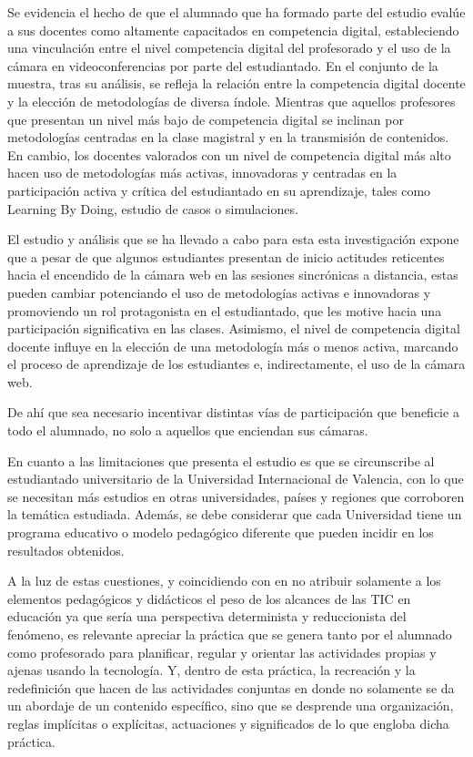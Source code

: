 \documentclass[spanish]{textolivre}
\begin{document}
Se evidencia el hecho de que el alumnado que ha formado parte del estudio evalúe a sus docentes como altamente capacitados en competencia digital, estableciendo una vinculación entre el nivel competencia digital del profesorado y el uso de la cámara en videoconferencias por parte del estudiantado. En el conjunto de la muestra, tras su análisis, se refleja la relación entre la competencia digital docente y la elección de metodologías de diversa índole. Mientras que aquellos profesores que presentan un nivel más bajo de competencia digital se inclinan por metodologías centradas en la clase magistral y en la transmisión de contenidos. En cambio, los docentes valorados con un nivel de competencia digital más alto hacen uso de metodologías más activas, innovadoras y centradas en la participación activa y crítica del estudiantado en su aprendizaje, tales como Learning By Doing, estudio de casos o simulaciones.

El estudio y análisis que se ha llevado a cabo para esta esta investigación expone que a pesar de que algunos estudiantes presentan de inicio actitudes reticentes hacia el encendido de la cámara web en las sesiones sincrónicas a distancia, estas pueden cambiar potenciando el uso de metodologías activas e innovadoras y promoviendo un rol protagonista en el estudiantado, que les motive hacia una participación significativa en las clases. Asimismo, el nivel de competencia digital docente influye en la elección de una metodología más o menos activa, marcando el proceso de aprendizaje de los estudiantes e, indirectamente, el uso de la cámara web.

De ahí que sea necesario incentivar distintas vías de participación que beneficie a todo el alumnado, no solo a aquellos que enciendan sus cámaras.

En cuanto a las limitaciones que presenta el estudio es que se circunscribe al estudiantado universitario de la Universidad Internacional de Valencia, con lo que se necesitan más estudios en otras universidades, países y regiones que corroboren la temática estudiada. Además, se debe considerar que cada Universidad tiene un programa educativo o modelo pedagógico diferente que pueden incidir en los resultados obtenidos.

A la luz de estas cuestiones, y coincidiendo con \textcite{coll_aprender_2009} en no atribuir solamente a los elementos pedagógicos y didácticos el peso de los alcances de las TIC en educación ya que sería una perspectiva determinista y reduccionista del fenómeno, es relevante apreciar la práctica que se genera tanto por el alumnado como profesorado para planificar, regular y orientar las actividades propias y ajenas usando la tecnología. Y, dentro de esta práctica, la recreación y la redefinición que hacen de las actividades conjuntas en donde no solamente se da un abordaje de un contenido específico, sino que se desprende una organización, reglas implícitas o explícitas, actuaciones y significados de lo que engloba dicha práctica.
\end{document}
